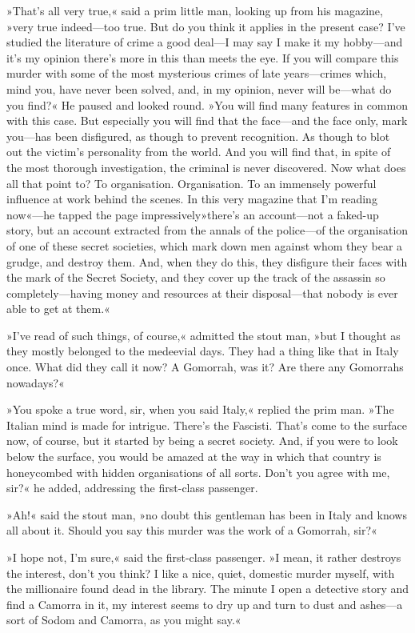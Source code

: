 »That's all very true,« said a prim little man, looking up from his magazine, »very true indeed—too true. But do you think it applies in the present case? I've studied the literature of crime a good deal—I may say I make it my hobby—and it's my opinion there's more in this than meets the eye. If you will compare this murder with some of the most mysterious crimes of late years—crimes which, mind you, have never been solved, and, in my opinion, never will be—what do you find?« He paused and looked round. »You will find many features in common with this case. But especially you will find that the face—and the face only, mark you—has been disfigured, as though to prevent recognition. As though to blot out the victim's personality from the world. And you will find that, in spite of the most thorough investigation, the criminal is never discovered. Now what does all that point to? To organisation. Organisation. To an immensely powerful influence at work behind the scenes. In this very magazine that I'm reading now«—he tapped the page impressively\longdash»there's an account—not a faked-up story, but an account extracted from the annals of the police—of the organisation of one of these secret societies, which mark down men against whom they bear a grudge, and destroy them. And, when they do this, they disfigure their faces with the mark of the Secret Society, and they cover up the track of the assassin so completely—having money and resources at their disposal—that nobody is ever able to get at them.«

»I've read of such things, of course,« admitted the stout man, »but I thought as they mostly belonged to the medeevial days. They had a thing like that in Italy once. What did they call it now? A Gomorrah, was it? Are there any Gomorrahs nowadays?«

»You spoke a true word, sir, when you said Italy,« replied the prim man. »The Italian mind is made for intrigue. There's the Fascisti. That's come to the surface now, of course, but it started by being a secret society. And, if you were to look below the surface, you would be amazed at the way in which that country is honeycombed with hidden organisations of all sorts. Don't you agree with me, sir?« he added, addressing the first-class passenger.

»Ah!« said the stout man, »no doubt this gentleman has been in Italy and knows all about it. Should you say this murder was the work of a Gomorrah, sir?«

»I hope not, I'm sure,« said the first-class passenger. »I mean, it rather destroys the interest, don't you think? I like a nice, quiet, domestic murder myself, with the millionaire found dead in the library. The minute I open a detective story and find a Camorra in it, my interest seems to dry up and turn to dust and ashes—a sort of Sodom and Camorra, as you might say.«

